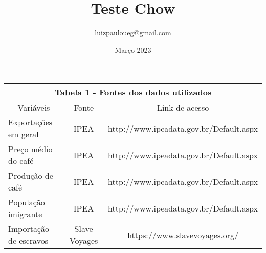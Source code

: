 \documentclass{article}
\title{Teste Chow}
\author{luizpauloueg@gmail.com}
\date{Março 2023}
\begin{document}
\begin{table}[]
\begin{tabular}{@{}lcc@{}}
\toprule
\multicolumn{3}{c}{Tabela 1 - Fontes dos dados utilizados}                              \\
\hline
\midrule
\multicolumn{1}{c}{Variáveis} & Fonte         & Link de acesso                          \\
\hline
Exportações em geral          & IPEA          & http://www.ipeadata.gov.br/Default.aspx \\
Preço médio do café           & IPEA          & http://www.ipeadata.gov.br/Default.aspx \\
Produção de café              & IPEA          & http://www.ipeadata.gov.br/Default.aspx \\
População imigrante           & IPEA          & http://www.ipeadata.gov.br/Default.aspx \\
Importação de escravos         & Slave Voyages & https://www.slavevoyages.org/           \\
\hline
\bottomrule
\end{tabular}
\end{table}
\end{document}
